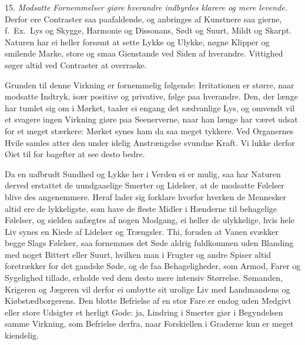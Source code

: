 \documentclass[12pt,a4paper]{article}
\newcommand{\opage}[1]{\marginnote{\footnotesize\textit{[#1]}}}
\begin{document}
\opage{85} 15. \emph{Modsatte Fornemmelser giøre hverandre indbyrdes klarere og mere levende.}
Derfor ere Contraster saa paafaldende, og anbringes af Kunstnere saa gierne, f.~Ex.\ Lys
og Skygge, Harmonie og Dissonans, Sødt og Suurt, Mildt og Skarpt. Naturen har ei heller
forsømt at sette Lykke og Ulykke, nøgne Klipper og smilende Marke, store og smaa
Gienstande ved Siden af hverandre. Vittighed søger altid ved Contraster at overraske.

Grunden til denne Virkning er fornemmelig følgende: Irritationen er større, naar modsatte
Indtryk, især positive og privative, følge paa hverandre. Den, der længe har tumlet sig
om i Mørket, taaler ei engang det sædvanlige Lys, og omvendt vil et svagere ingen
Virkning giøre paa Seenerverne, naar han længe har været udsat for et meget stærkere:
Mørket synes ham da saa meget tykkere. Ved Organernes Hvile samles atter den under
idelig Anstrængelse svundne Kraft. Vi lukke derfor Øiet til for bagefter at see desto
bedre.

Da en uafbrudt Sundhed og Lykke her i Verden ei er mulig, saa har Naturen derved
erstattet de uundgaaelige Smerter og Lidelser, at de modsatte Følelser blive des
angenemmere. Heraf lader sig forklare hvorfor hverken de Mennesker altid ere de
lykkeligste, som have de fleste Midler i Hænderne til behagelige Følelser, og sielden
anfægtes af nogen Modgang, ei heller de ulykkelige, hvis hele Liv synes en Kiede af
Lidelser og
\opage{86} Trængsler. Thi, foruden at Vanen svækker begge Slags Følelser, saa fornemmes det Søde
aldrig fuldkommen uden Blanding med noget Bittert eller Suurt, hvilken man i Frugter og
andre Spiser altid foretrækker for det gandske Søde, og de faa Behageligheder, som
Armod, Farer og Sygelighed tillade, erholde ved dem desto mere intensiv Størrelse.
Sømanden, Krigeren og Jægeren vil derfor ei ombytte sit urolige Liv med Landmandens og
Kiøbstædborgerens. Den blotte Befrielse af en stor Fare er endog uden Medgivt eller
store Udsigter et herligt Gode: ja, Lindring i Smerter giør i Begyndelsen samme
Virkning, som Befrielse derfra, naar Forskiellen i Graderne kun er meget kiendelig.
\end{document}
